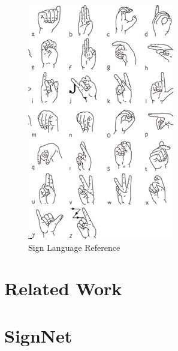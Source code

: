 \documentclass[10pt,twocolumn,letterpaper]{article}
\begin{document}
\begin{figure}[t]
\begin{center}
 \includegraphics[width=0.8\linewidth]{imgs/NIDCD-ASL-hands-2014.jpg}
\end{center}
\caption{Sign Language Reference}
\label{fig:long}
\end{figure}


\blindtext



\section{Related Work}

	
\blindtext

\blindtext




\section{SignNet}
\end{document}
